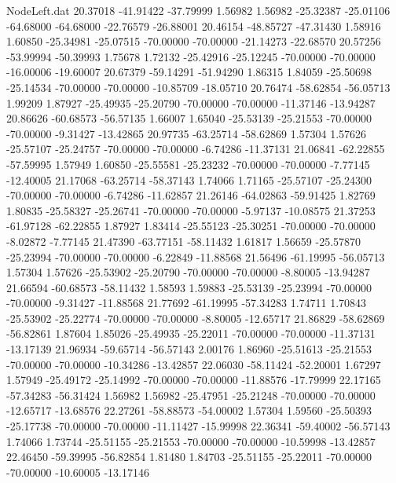 \begin{filecontents}{NodeLeft.dat}
  20.37018  -41.91422  -37.79999     1.56982    1.56982  -25.32387  -25.01106  -64.68000  -64.68000  -22.76579  -26.88001
  20.46154  -48.85727  -47.31430     1.58916    1.60850  -25.34981  -25.07515  -70.00000  -70.00000  -21.14273  -22.68570
  20.57256  -53.99994  -50.39993     1.75678    1.72132  -25.42916  -25.12245  -70.00000  -70.00000  -16.00006  -19.60007
  20.67379  -59.14291  -51.94290     1.86315    1.84059  -25.50698  -25.14534  -70.00000  -70.00000  -10.85709  -18.05710
  20.76474  -58.62854  -56.05713     1.99209    1.87927  -25.49935  -25.20790  -70.00000  -70.00000  -11.37146  -13.94287
  20.86626  -60.68573  -56.57135     1.66007    1.65040  -25.53139  -25.21553  -70.00000  -70.00000   -9.31427  -13.42865
  20.97735  -63.25714  -58.62869     1.57304    1.57626  -25.57107  -25.24757  -70.00000  -70.00000   -6.74286  -11.37131
  21.06841  -62.22855  -57.59995     1.57949    1.60850  -25.55581  -25.23232  -70.00000  -70.00000   -7.77145  -12.40005
  21.17068  -63.25714  -58.37143     1.74066    1.71165  -25.57107  -25.24300  -70.00000  -70.00000   -6.74286  -11.62857
  21.26146  -64.02863  -59.91425     1.82769    1.80835  -25.58327  -25.26741  -70.00000  -70.00000   -5.97137  -10.08575
  21.37253  -61.97128  -62.22855     1.87927    1.83414  -25.55123  -25.30251  -70.00000  -70.00000   -8.02872   -7.77145
  21.47390  -63.77151  -58.11432     1.61817    1.56659  -25.57870  -25.23994  -70.00000  -70.00000   -6.22849  -11.88568
  21.56496  -61.19995  -56.05713     1.57304    1.57626  -25.53902  -25.20790  -70.00000  -70.00000   -8.80005  -13.94287
  21.66594  -60.68573  -58.11432     1.58593    1.59883  -25.53139  -25.23994  -70.00000  -70.00000   -9.31427  -11.88568
  21.77692  -61.19995  -57.34283     1.74711    1.70843  -25.53902  -25.22774  -70.00000  -70.00000   -8.80005  -12.65717
  21.86829  -58.62869  -56.82861     1.87604    1.85026  -25.49935  -25.22011  -70.00000  -70.00000  -11.37131  -13.17139
  21.96934  -59.65714  -56.57143     2.00176    1.86960  -25.51613  -25.21553  -70.00000  -70.00000  -10.34286  -13.42857
  22.06030  -58.11424  -52.20001     1.67297    1.57949  -25.49172  -25.14992  -70.00000  -70.00000  -11.88576  -17.79999
  22.17165  -57.34283  -56.31424     1.56982    1.56982  -25.47951  -25.21248  -70.00000  -70.00000  -12.65717  -13.68576
  22.27261  -58.88573  -54.00002     1.57304    1.59560  -25.50393  -25.17738  -70.00000  -70.00000  -11.11427  -15.99998
  22.36341  -59.40002  -56.57143     1.74066    1.73744  -25.51155  -25.21553  -70.00000  -70.00000  -10.59998  -13.42857
  22.46450  -59.39995  -56.82854     1.81480    1.84703  -25.51155  -25.22011  -70.00000  -70.00000  -10.60005  -13.17146

\end{filecontents}
